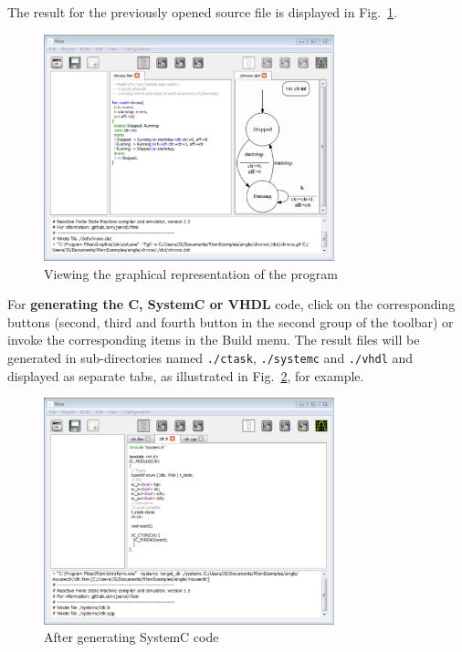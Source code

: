The result for the previously opened source file is displayed in Fig.~\ref{fig:make-dot}.

\begin{figure}[h]
  \centering
  \includegraphics[width=0.75\textwidth]{figs/gui/make-dot}
  \caption{Viewing the graphical representation of the program}
  \label{fig:make-dot}
\end{figure}

\medskip For \textbf{generating the C, SystemC or VHDL} code, click on the corresponding buttons
(second, third and fourth button in the second group of the toolbar) or invoke the corresponding
items in the \textsf{Build} menu. The result files will be generated in sub-directories named
\verb|./ctask|, \verb|./systemc| and \verb|./vhdl| and displayed as separate tabs, as
illustrated in Fig.~\ref{fig:make-systemc}, for example.

\begin{figure}[h]
  \centering
  \includegraphics[width=0.75\textwidth]{figs/gui/make-systemc}
  \caption{After generating SystemC code}
  \label{fig:make-systemc}
\end{figure}

